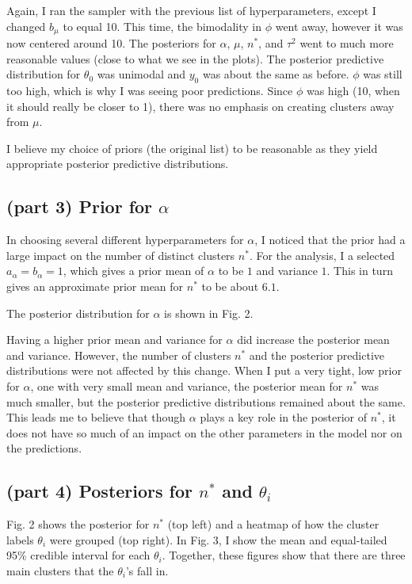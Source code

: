 \documentclass[12pt]{article}
\begin{document}
Again, I ran the sampler with the previous list of hyperparameters, except I changed $b_\mu$ to equal 10. This time, the bimodality in $\phi$ went away, however it was now centered around 10. The posteriors for $\alpha$, $\mu$, $n^*$, and $\tau^2$ went to much more reasonable values (close to what we see in the plots). The posterior predictive distribution for $\theta_0$ was unimodal and $y_0$ was about the same as before. $\phi$ was still too high, which is why I was seeing poor predictions. Since $\phi$ was high (10, when it should really be closer to 1), there was no emphasis on creating clusters away from $\mu$.

I believe my choice of priors (the original list) to be reasonable as they yield appropriate posterior predictive distributions.

\subsection*{(part 3) Prior for $\alpha$}

In choosing several different hyperparameters for $\alpha$, I noticed that the prior had a large impact on the number of distinct clusters $n^*$. For the analysis, I a selected $a_\alpha=b_\alpha=1$, which gives a prior mean of $\alpha$ to be $1$ and variance $1$. This in turn gives an approximate prior mean for $n^*$ to be about $6.1$.

The posterior distribution for $\alpha$ is shown in Fig. 2.

Having a higher prior mean and variance for $\alpha$ did increase the posterior mean and variance. However, the number of clusters $n^*$ and the posterior predictive distributions were not affected by this change. When I put a very tight, low prior for $\alpha$, one with very small mean and variance, the posterior mean for $n^*$ was much smaller, but the posterior predictive distributions remained about the same. This leads me to believe that though $\alpha$ plays a key role in the posterior of $n^*$, it does not have so much of an impact on the other parameters in the model nor on the predictions.

\subsection*{(part 4) Posteriors for $n^*$ and $\theta_i$}

Fig. 2 shows the posterior for $n^*$ (top left) and a heatmap of how the cluster labels $\theta_i$ were grouped (top right). In Fig. 3, I show the mean and equal-tailed 95\% credible interval for each $\theta_i$. Together, these figures show that there are three main clusters that the $\theta_i$'s fall in.
\end{document}
